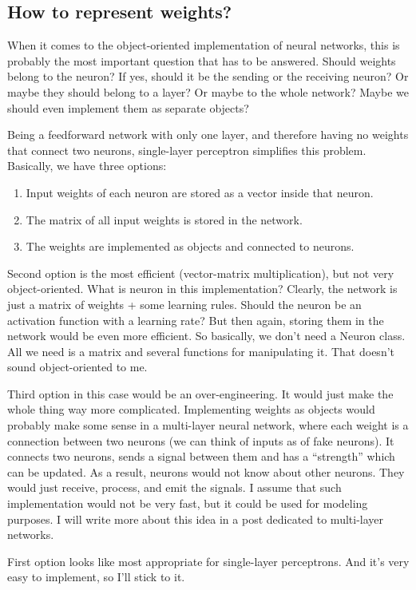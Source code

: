 \subsection{How to represent weights?}
When it comes to the object-oriented implementation of neural networks, this is probably the most important question that has to be answered. Should weights belong to the neuron? If yes, should it be the sending or the receiving neuron? Or maybe they should belong to a layer? Or maybe to the whole network? Maybe we should even implement them as separate objects?

Being a feedforward network with only one layer, and therefore having no weights that connect two neurons, single-layer perceptron simplifies this problem. Basically, we have three options:
\begin{enumerate}
  \item Input weights of each neuron are stored as a vector inside that neuron.
  \item The matrix of all input weights is stored in the network.
  \item The weights are implemented as objects and connected to neurons.
\end{enumerate}

Second option is the most efficient (vector-matrix multiplication), but not very object-oriented. What is neuron in this implementation? Clearly, the network is just a matrix of weights + some learning rules. Should the neuron be an activation function with a learning rate? But then again, storing them in the network would be even more efficient. So basically, we don’t need a Neuron class. All we need is a matrix and several functions for manipulating it. That doesn’t sound object-oriented to me.

Third option in this case would be an over-engineering. It would just make the whole thing way more complicated. Implementing weights as objects would probably make some sense in a multi-layer neural network, where each weight is a connection between two neurons (we can think of inputs as of fake neurons). It connects two neurons, sends a signal between them and has a “strength” which can be updated. As a result, neurons would not know about other neurons. They would just receive, process, and emit the signals. I assume that such implementation would not be very fast, but it could be used for modeling purposes. I will write more about this idea in a post dedicated to multi-layer networks.

First option looks like most appropriate for single-layer perceptrons. And it’s very easy to implement, so I’ll stick to it.

